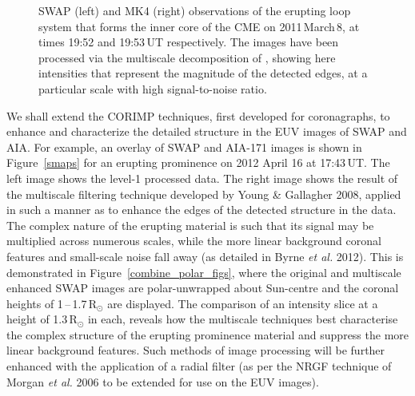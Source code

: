 \documentclass[preprint2]{aastex}
\begin{document}
\begin{figure}[t]
\caption{SWAP (left) and MK4 (right) observations of the erupting loop system that forms the inner core of the CME on 2011\,March\,8, at times 19:52 and 19:53\,UT respectively. The images have been processed via the multiscale decomposition of \citet{2008SoPh..248..457Y}, showing here intensities that represent the magnitude of the detected edges, at a particular scale with high signal-to-noise ratio.}
\label{swap_front}
\end{figure}

We shall extend the CORIMP techniques, first developed for coronagraphs, to enhance and characterize the detailed structure in the EUV images of SWAP and AIA. For example, an overlay of SWAP and AIA-171 images is shown in Figure~\ref{smaps} for an erupting prominence on 2012 April 16 at 17:43\,UT. The left image shows the level-1 processed data. The right image shows the result of the multiscale filtering technique developed by Young \& Gallagher 2008, applied in such a manner as to enhance the edges of the detected structure in the data. The complex nature of the erupting material is such that its signal may be multiplied across numerous scales, while the more linear background coronal features and small-scale noise fall away (as detailed in Byrne \emph{et al.} 2012). This is demonstrated in Figure~\ref{combine_polar_figs}, where the original and multiscale enhanced SWAP images are polar-unwrapped about Sun-centre and the coronal heights of 1\,--\,1.7\,R$_\odot$ are displayed. The comparison of an intensity slice at a height of 1.3\,R$_\odot$ in each, reveals how the multiscale techniques best characterise the complex structure of the erupting prominence material and suppress the more linear background features. Such methods of image processing will be further enhanced with the application of a radial filter (as per the NRGF technique of Morgan \emph{et al.} 2006 to be extended for use on the EUV images).
\end{document}
